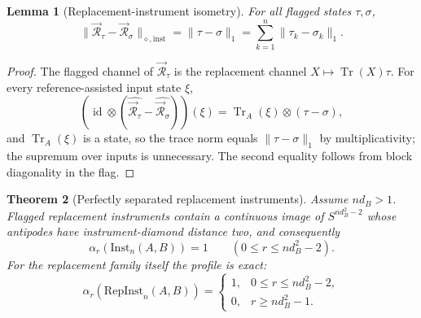 \documentclass[11pt,a4paper]{article}
\newtheorem{theorem}{Theorem}[section]
\newtheorem{lemma}[theorem]{Lemma}
\newcommand{\Inst}{\mathrm{Inst}}
\newcommand{\RepInst}{\mathrm{RepInst}}
\newcommand{\Tr}{\operatorname{Tr}}
\newcommand{\id}{\operatorname{id}}
\begin{document}
\begin{lemma}[Replacement-instrument isometry]
\label{lem:replacement-isometry}
For all flagged states $\tau,\sigma$,
\[
\|\vec{\mathcal R}_\tau-\vec{\mathcal R}_\sigma\|_{\diamond,\mathrm{inst}}
=\|\tau-\sigma\|_1=\sum_{k=1}^n\|\tau_k-\sigma_k\|_1.
\]
\end{lemma}

\begin{proof}
The flagged channel of $\vec{\mathcal R}_\tau$ is the replacement channel $X\mapsto\Tr(X)\tau$. For every reference-assisted input state $\xi$,
\[
(\id\otimes(\widehat{\vec{\mathcal R}_\tau}-\widehat{\vec{\mathcal R}_\sigma}))(\xi)
=\Tr_A(\xi)\otimes(\tau-\sigma),
\]
and $\Tr_A(\xi)$ is a state, so the trace norm equals $\|\tau-\sigma\|_1$ by multiplicativity; the supremum over inputs is unnecessary. The second equality follows from block diagonality in the flag.
\end{proof}

\begin{theorem}[Perfectly separated replacement instruments]
\label{thm:replacement-profile}
Assume $nd_B>1$. Flagged replacement instruments contain a continuous image of $S^{nd_B^2-2}$ whose antipodes have instrument-diamond distance two, and consequently
\[
\alpha_r(\Inst_n(A,B))=1\qquad(0\le r\le nd_B^2-2).
\]
For the replacement family itself the profile is exact:
\[
\alpha_r(\RepInst_n(A,B))=
\begin{cases}
1,&0\le r\le nd_B^2-2,\\
0,&r\ge nd_B^2-1.
\end{cases}
\]
\end{theorem}
\end{document}
